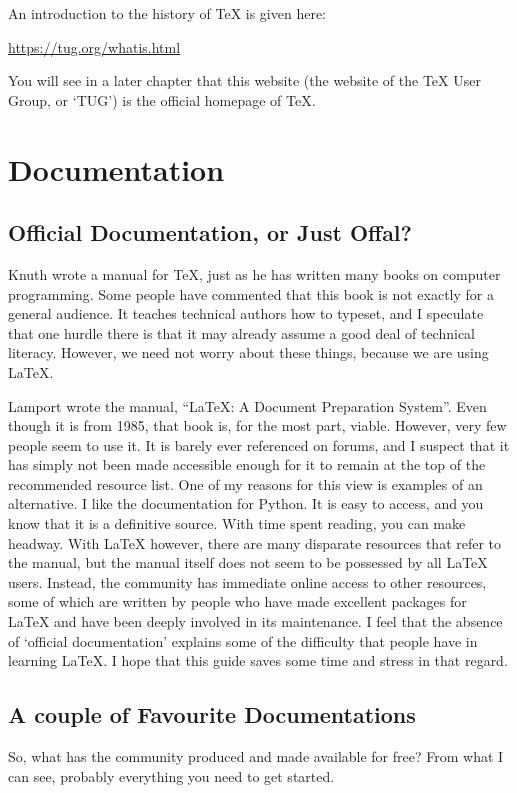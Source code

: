 \documentclass[11pt, oneside]{memoir}
\begin{document}
An introduction to the history of TeX is given here:

\url{https://tug.org/whatis.html}

You will see in a later chapter that this website (the website of the TeX User Group, or `TUG') is the official homepage of TeX.

\chapter{Documentation}
\section*{Official Documentation, or Just Offal?}

Knuth wrote a manual for TeX, just as he has written many books on computer programming. Some people have commented that this book is not exactly for a general audience. It teaches technical authors how to typeset, and I speculate that one hurdle there is that it may already assume a good deal of technical literacy. However, we need not worry about these things, because we are using LaTeX.

Lamport wrote the manual, ``LaTeX: A Document Preparation System''. Even though it is from 1985, that book is, for the most part, viable. However, very few people seem to use it. It is barely ever referenced on forums, and I suspect that it has simply not been made accessible enough for it to remain at the top of the recommended resource list. One of my reasons for this view is examples of an alternative. I like the documentation for Python. It is easy to access, and you know that it is a definitive source. With time spent reading, you can make headway. With LaTeX however, there are many disparate resources that refer to the manual, but the manual itself does not seem to be possessed by all LaTeX users. Instead, the community has immediate online access to other resources, some of which are written by people who have made excellent packages for LaTeX and have been deeply involved in its maintenance. I feel that the absence of `official documentation' explains some of the difficulty that people have in learning LaTeX. I hope that this guide saves some time and stress in that regard.

\section{A couple of Favourite Documentations}
So, what has the community produced and made available for free? From what I can see, probably everything you need to get started.
\end{document}
